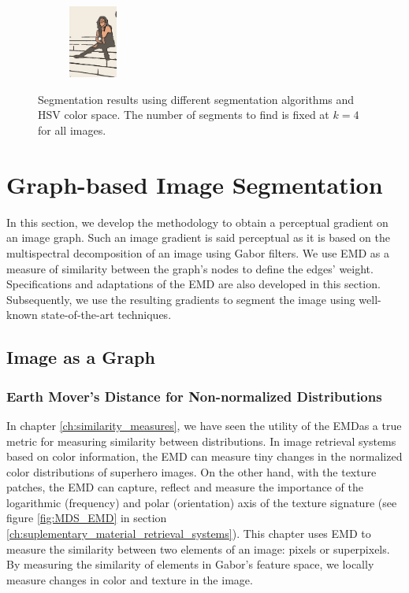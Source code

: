 \documentclass[journal]{IEEEtran}
\begin{document}
\begin{figure}[!ht]
    \begin{subfigure}[b]{0.23\textwidth}
    	\centering
        \includegraphics[height=67.68857pt]{181021_Birch_const_segm}
    \end{subfigure}     
	\caption{Segmentation results using different segmentation algorithms and HSV color space. The number of segments to find is fixed at $ k = 4 $ for all images. }\label{fig:BSD_clustering_results}    
\end{figure}



\section{Graph-based Image Segmentation}

In this section, we develop the methodology to obtain a perceptual gradient on an image graph. Such an image gradient is said perceptual as it is based on the multispectral decomposition of an image using Gabor filters. We use EMD as a measure of similarity between the graph's nodes to define the edges' weight. Specifications and adaptations of the EMD are also developed in this section. Subsequently, we use the resulting gradients to segment the image using well-known state-of-the-art techniques.  

\subsection{Image as a Graph}

\subsubsection{Earth Mover's Distance for Non-normalized Distributions}
In chapter \ref{ch:similarity_measures}, we have seen the utility of the EMDas a true metric for measuring similarity between distributions. In image retrieval systems based on color information, the EMD can measure tiny changes in the normalized color distributions of superhero images. On the other hand, with the texture patches, the EMD can capture, reflect and measure the importance of the logarithmic (frequency) and polar (orientation) axis of the texture signature (see figure \ref{fig:MDS_EMD} in section \ref{ch:suplementary_material_retrieval_systems}). This chapter uses EMD to measure the similarity between two elements of an image: pixels or superpixels. By measuring the similarity of elements in Gabor's feature space, we locally measure changes in color and texture in the image. 
\end{document}
